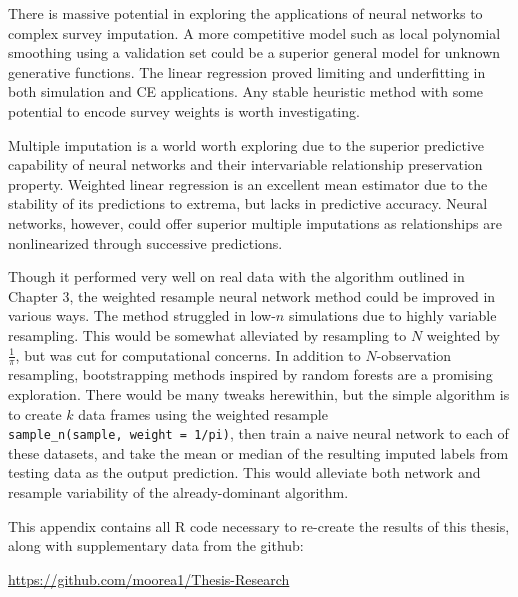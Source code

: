 \documentclass[12pt,twoside]{reedthesis}
\begin{document}
There is massive potential in exploring the applications of neural
networks to complex survey imputation. A more competitive model such as
local polynomial smoothing using a validation set could be a superior
general model for unknown generative functions. The linear regression
proved limiting and underfitting in both simulation and CE applications.
Any stable heuristic method with some potential to encode survey weights
is worth investigating.

Multiple imputation is a world worth exploring due to the superior
predictive capability of neural networks and their intervariable
relationship preservation property. Weighted linear regression is an
excellent mean estimator due to the stability of its predictions to
extrema, but lacks in predictive accuracy. Neural networks, however,
could offer superior multiple imputations as relationships are
nonlinearized through successive predictions.

Though it performed very well on real data with the algorithm outlined
in Chapter 3, the weighted resample neural network method could be
improved in various ways. The method struggled in low-\(n\) simulations
due to highly variable resampling. This would be somewhat alleviated by
resampling to \(N\) weighted by \(\frac{1}{\pi}\), but was cut for
computational concerns. In addition to \(N\)-observation resampling,
bootstrapping methods inspired by random forests are a promising
exploration. There would be many tweaks herewithin, but the simple
algorithm is to create \(k\) data frames using the weighted resample
\texttt{sample\_n(sample,\ weight\ =\ 1/pi)}, then train a naive neural
network to each of these datasets, and take the mean or median of the
resulting imputed labels from testing data as the output prediction.
This would alleviate both network and resample variability of the
already-dominant algorithm.

\appendix

This appendix contains all R code necessary to re-create the results of
this thesis, along with supplementary data from the github:

\url{https://github.com/moorea1/Thesis-Research}
\end{document}
